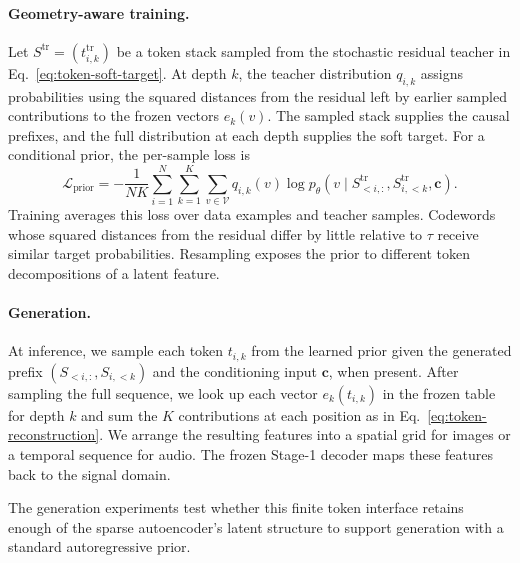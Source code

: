 \paragraph{Geometry-aware training.}
Let $S^{\mathrm{tr}}=(t^{\mathrm{tr}}_{i,k})$ be a token stack sampled from the stochastic residual teacher in Eq.~\eqref{eq:token-soft-target}. At depth $k$, the teacher distribution $q_{i,k}$ assigns probabilities using the squared distances from the residual left by earlier sampled contributions to the frozen vectors $e_k(v)$. The sampled stack supplies the causal prefixes, and the full distribution at each depth supplies the soft target. For a conditional prior, the per-sample loss is
\begin{equation}
    \mathcal{L}_{\mathrm{prior}}=-\frac{1}{NK}\sum_{i=1}^{N}\sum_{k=1}^{K}\sum_{v\in\mathcal{V}}q_{i,k}(v)\log p_{\theta}\!\left(v\mid S^{\mathrm{tr}}_{<i,:},S^{\mathrm{tr}}_{i,<k},\boldsymbol{c}\right).
    \label{eq:stage2-prior-loss}
\end{equation}
Training averages this loss over data examples and teacher samples. Codewords whose squared distances from the residual differ by little relative to $\tau$ receive similar target probabilities. Resampling exposes the prior to different token decompositions of a latent feature.

\paragraph{Generation.}
At inference, we sample each token $t_{i,k}$ from the learned prior given the generated prefix $(S_{<i,:},S_{i,<k})$ and the conditioning input $\boldsymbol{c}$, when present. After sampling the full sequence, we look up each vector $e_k(t_{i,k})$ in the frozen table for depth $k$ and sum the $K$ contributions at each position as in Eq.~\eqref{eq:token-reconstruction}. We arrange the resulting features into a spatial grid for images or a temporal sequence for audio. The frozen Stage-1 decoder maps these features back to the signal domain.

The generation experiments test whether this finite token interface retains enough of the sparse autoencoder's latent structure to support generation with a standard autoregressive prior.
